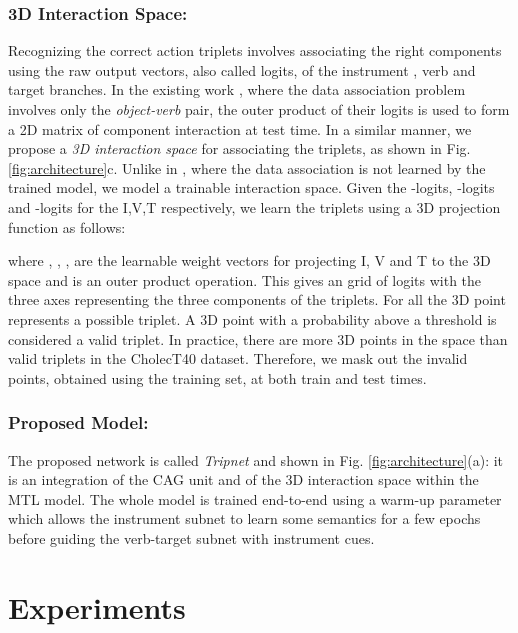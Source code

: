 \documentclass[english,runningheads,a4paper]{llncs}
\begin{document}
\subsubsection{3D Interaction Space: }
Recognizing the correct action triplets involves associating the right  components using the raw output vectors, also called logits, of the instrument , verb  and target  branches.
In the existing work \cite{shen_hoi_wacv2018}, where the data association problem involves only the \textit{object-verb} pair, the outer product of their logits is used to form a 2D matrix of component interaction at test time.
In a similar manner, we propose a {\it 3D interaction space} for associating the triplets, as shown in Fig. \ref{fig:architecture}c. 
Unlike in \cite{shen_hoi_wacv2018}, where the data association is not learned by the trained model, we model a trainable interaction space.
Given the -logits, -logits and -logits for the I,V,T respectively, we learn the triplets  using a 3D projection function  as follows:

where , , , are the learnable weight vectors for projecting I, V and T to the 3D space and  is an outer product operation. 
This gives an  grid of logits with the three axes representing the three components of the triplets. For all  the 3D point  represents a possible triplet. A 3D point with a probability above a threshold is considered a valid triplet.
In practice, there are more 3D points in the space than valid triplets in the CholecT40 dataset. 
Therefore, we mask out the invalid points, obtained using the training set, at both train and test times.


\subsubsection{Proposed Model: }
The proposed network is called \textit{Tripnet} and shown in Fig. \ref{fig:architecture}(a): it is an integration of the CAG unit and of the 3D interaction space within the MTL model. 
The whole model is trained end-to-end using a warm-up parameter which allows the instrument subnet to learn some semantics for a few epochs before guiding the verb-target subnet with instrument cues.
 \section{Experiments}
\end{document}
